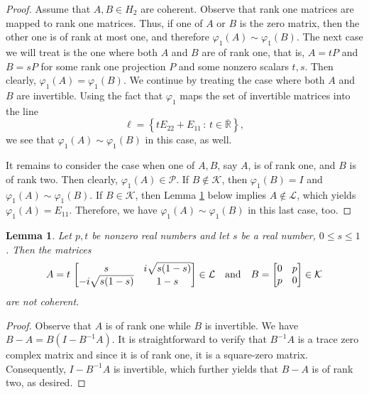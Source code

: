 \documentclass[10pt]{amsart}
\newtheorem{lemma}[theorem]{Lemma}
\theoremstyle{definition}
\theoremstyle{remark}
\numberwithin{subsection}{section}
\numberwithin{equation}{section}
\newcommand\oR{{\overline{\mathbb{R}}}}
\begin{document}
\begin{proof}
Assume that $A,B \in H_2$ are coherent. Observe that rank one matrices are mapped to rank one matrices. Thus, if one of $A$ or $B$ is the zero matrix, then the other one is of rank at most one, and therefore $\varphi_1 (A) \sim \varphi_1 (B)$. The next case we will treat is the one where both $A$ and $B$ are of rank one, that is, $A=tP$ and $B=sP$ for some rank one projection $P$ and some nonzero scalars $t,s$.
Then clearly, $\varphi_1 (A) = \varphi_1 (B)$. We continue by treating the case where both $A$ and $B$ are invertible. Using the fact that $\varphi_1$ maps the set of invertible matrices into the line
\[
\ell = \left\{ tE_{22} + E_{11} \, :  \, t \in {\oR} \right\},
\]
we see that $\varphi_1 (A) \sim \varphi_1 (B)$ in this case, as well.

It remains to consider the case when one of $A,B$, say $A$, is of rank one, and $B$ is of rank two. Then clearly, $\varphi_1 (A) \in \mathcal{P}$. 
If $B \not\in \mathcal{K}$, then $\varphi_1 (B) = I$ and $\varphi_1 (A) \sim \varphi_1 (B)$.  If $B \in \mathcal{K}$, then Lemma \ref{jelensr} below implies $A\not\in \mathcal{L}$, which yields 
$\varphi_1 (A) = E_{11}$. Therefore, we have $\varphi_1 (A) \sim \varphi_1 (B)$ in this last case, too. 
\end{proof}


\begin{lemma}\label{jelensr}
Let $p,t$ be nonzero real numbers and let $s$ be a real number, $0 \le s \le 1$. Then the matrices
\[
A=t \,  \left[ \begin{matrix} s &  i\sqrt{ s (1-s)}  \cr -i \sqrt{ s (1-s)}  & 1 - s  \end{matrix} \right]\in \mathcal{L} \ \ \ \text{and} \ \ \  B=\left[ \begin{matrix} 0 &  p  \cr p  & 0  \end{matrix} \right]\in \mathcal{K}
\]
are not coherent.
\end{lemma}
\begin{proof}
Observe that $A$ is of rank one while $B$ is invertible. We have
$B - A = B (I - B^{-1} A)$.
It is straightforward to verify that $B^{-1} A$ is a trace zero complex matrix and since it is of rank one, it is a square-zero matrix. Consequently, $I - B^{-1} A$ is invertible, which further yields that $B - A$ is of rank two, as desired.
\end{proof}
\end{document}
